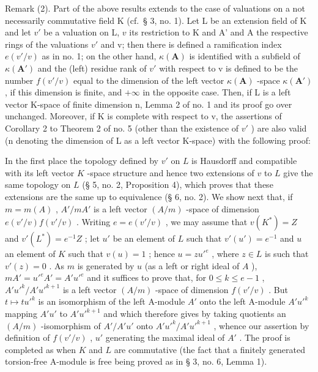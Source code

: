 Remark (2). Part of the above results extends to the case of valuations on a not necessarily commutative field K (cf.~§ 3, no. 1). Let L be an extension field of K and let \(v'\) be a valuation on L, \(v\) its restriction to K and A' and A the respective rings of the valuations \(v'\) and v; then there is defined a ramification index \(e(v'/v)\) as in no. 1; on the other hand, \(\kappa(\mathbf{A})\) is identified with a subfield of \(\kappa(\mathbf{A}')\) and the (left) residue rank of \(v'\) with respect to v is defined to be the number \(f(v'/v)\) equal to the dimension of the left vector \(\kappa(\mathbf{A})\) -space \(\kappa(\mathbf{A}')\) , if this dimension is finite, and \(+\infty\) in the opposite case. Then, if L is a left vector K-space of finite dimension n, Lemma 2 of no. 1 and its proof go over unchanged. Moreover, if K is complete with respect to v, the assertions of Corollary 2 to Theorem 2 of no. 5 (other than the existence of \(v'\) ) are also valid (n denoting the dimension of L as a left vector K-space) with the following proof:

In the first place the topology defined by \(v'\) on \(L\) is Hausdorff and compatible with its left vector \(K\) -space structure and hence two extensions of \(v\) to \(L\) give the same topology on \(L\) (§ 5, no. 2, Proposition 4), which proves that these extensions are the same up to equivalence (§ 6, no. 2). We show next that, if \(m = m(A)\) , \(A'/mA'\) is a left vector \((A/m)\) -space of dimension \(e(v'/v)f(v'/v)\) . Writing \(e = e(v'/v)\) , we may assume that \(v(K^*) = Z\) and \(v'(L^*) = e^{-1}Z\) ; let \(u'\) be an element of \(L\) such that \(v'(u') = e^{-1}\) and \(u\) an element of \(K\) such that \(v(u) = 1\) ; hence \(u = zu'^e\) , where \(z \in L\) is such that \(v'(z) = 0\) . As \(m\) is generated by \(u\) (as a left or right ideal of \(A\) ), \(mA' = u'^eA' = A'u'^e\) and it suffices to prove that, for \(0 \leqslant k \leqslant e - 1\) , \(A'u'^k/A'u'^{k+1}\) is a left vector \((A/m)\) -space of dimension \(f(v'/v)\) . But \(t \mapsto tu'^k\) is an isomorphism of the left A-module \(A'\) onto the left A-module \(A'u'^k\) mapping \(A'u'\) to \(A'u'^{k+1}\) and which therefore gives by taking quotients an \((A/m)\) -isomorphism of \(A'/A'u'\) onto \(A'u'^k/A'u'^{k+1}\) , whence our assertion by definition of \(f(v'/v)\) , \(u'\) generating the maximal ideal of \(A'\) . The proof is completed as when \(K\) and \(L\) are commutative (the fact that a finitely generated torsion-free A-module is free being proved as in § 3, no. 6, Lemma 1).

